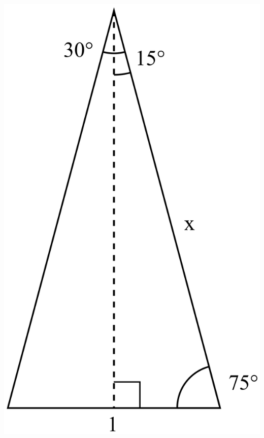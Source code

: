\documentclass{article}
\begin{document}
\vspace{0.15in}
\begin{center}
\includegraphics[scale=0.3]{triangle1.png}
\hspace{0.5in}

\end{center}
\end{document}
